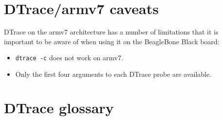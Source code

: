 \documentclass[a4paper,10pt]{article}
\begin{document}
\section*{DTrace/armv7 caveats}

DTrace on the armv7 architecture has a number of limitations that it is
important to be aware of when using it on the BeagleBone Black board:

\begin{itemize}
\item \texttt{dtrace -c} does not work on armv7.
\item Only the first four arguments to each DTrace probe are available.
\end{itemize}

\section*{DTrace glossary}
\end{document}
